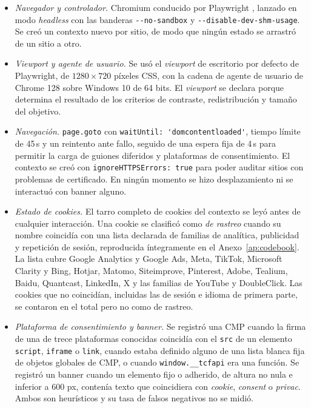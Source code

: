 \documentclass[pdflatex,sn-basic,Numbered]{sn-jnl}
\theoremstyle{thmstyleone}
\theoremstyle{thmstyletwo}
\theoremstyle{thmstylethree}
\begin{document}
\begin{itemize}
	\item \emph{Navegador y controlador.} Chromium conducido por Playwright \citep{playwright2026}, lanzado en modo \emph{headless} con las banderas \verb|--no-sandbox| y \verb|--disable-dev-shm-usage|. Se cre\'o un contexto nuevo por sitio, de modo que ning\'un estado se arrastr\'o de un sitio a otro.
	\item \emph{Viewport y agente de usuario.} Se us\'o el \emph{viewport} de escritorio por defecto de Playwright, de $1280 \times 720$ p\'ixeles CSS, con la cadena de agente de usuario de Chrome 128 sobre Windows 10 de 64 bits. El \emph{viewport} se declara porque determina el resultado de los criterios de contraste, redistribuci\'on y tama\~no del objetivo.
	\item \emph{Navegaci\'on.} \verb|page.goto| con \verb|waitUntil: 'domcontentloaded'|, tiempo l\'imite de 45\,s y un reintento ante fallo, seguido de una espera fija de 4\,s para permitir la carga de guiones diferidos y plataformas de consentimiento. El contexto se cre\'o con \verb|ignoreHTTPSErrors: true| para poder auditar sitios con problemas de certificado. En ning\'un momento se hizo desplazamiento ni se interactu\'o con banner alguno.
	\item \emph{Estado de cookies.} El tarro completo de cookies del contexto se ley\'o antes de cualquier interacci\'on. Una cookie se clasific\'o como \emph{de rastreo} cuando su nombre coincid\'ia con una lista declarada de familias de anal\'itica, publicidad y repetici\'on de sesi\'on, reproducida \'integramente en el Anexo~\ref{ap:codebook}. La lista cubre Google Analytics y Google Ads, Meta, TikTok, Microsoft Clarity y Bing, Hotjar, Matomo, Siteimprove, Pinterest, Adobe, Tealium, Baidu, Quantcast, LinkedIn, X y las familias de YouTube y DoubleClick. Las cookies que no coincid\'ian, incluidas las de sesi\'on e idioma de primera parte, se contaron en el total pero no como de rastreo.
	\item \emph{Plataforma de consentimiento y banner.} Se registr\'o una CMP cuando la firma de una de trece plataformas conocidas coincid\'ia con el \verb|src| de un elemento \verb|script|, \verb|iframe| o \verb|link|, cuando estaba definido alguno de una lista blanca fija de objetos globales de CMP, o cuando \verb|window.__tcfapi| era una funci\'on. Se registr\'o un banner cuando un elemento fijo o adherido, de altura no nula e inferior a 600 px, conten\'ia texto que coincidiera con \emph{cookie}, \emph{consent} o \emph{privac}. Ambos son heur\'isticos y su tasa de falsos negativos no se midi\'o.

\end{itemize}
\end{document}
